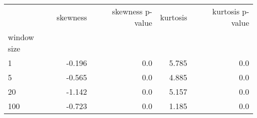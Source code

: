 \begin{tabular}{lrrrr}
\toprule
{} &  skewness &  skewness p-value &  kurtosis &  kurtosis p-value \\
window size &           &                   &           &                   \\
\midrule
1           &    -0.196 &               0.0 &     5.785 &               0.0 \\
5           &    -0.565 &               0.0 &     4.885 &               0.0 \\
20          &    -1.142 &               0.0 &     5.157 &               0.0 \\
100         &    -0.723 &               0.0 &     1.185 &               0.0 \\
\bottomrule
\end{tabular}
